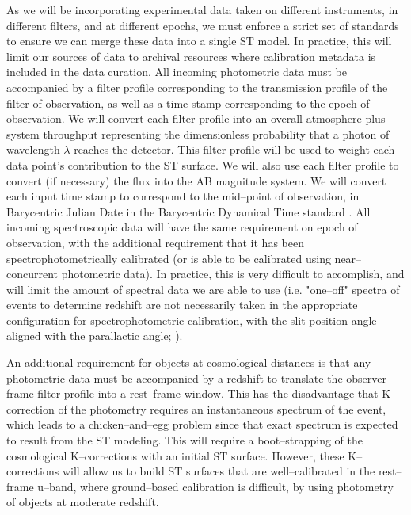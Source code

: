 As we will be incorporating experimental data taken on different instruments, in
different filters, and at different epochs, we must enforce a strict set of
standards to ensure we can merge these data into a single ST model. In practice,
this will limit our sources of data to archival resources where calibration
metadata is included in the data curation. All incoming photometric data must be
accompanied by a filter profile corresponding to the transmission profile of the
filter of observation, as well as a time stamp corresponding to the epoch of
observation.  We will convert each filter profile into an overall atmosphere
plus system throughput representing the dimensionless probability that a photon
of wavelength $\lambda$ reaches the detector.  This filter profile will be used
to weight each data point's contribution to the ST surface.  We will also use
each filter profile to convert (if necessary) the flux into the AB magnitude
system.  We will convert each input time stamp to correspond to the mid--point
of observation, in Barycentric Julian Date in the Barycentric Dynamical Time
standard \citep{2010PASP..122..935E}. All incoming spectroscopic data will have
the same requirement on epoch of observation, with the additional requirement
that it has been spectrophotometrically calibrated (or is able to be calibrated
using near--concurrent photometric data).  In practice, this is very difficult
to accomplish, and will limit the amount of spectral data we are able to use
(i.e. "one--off" spectra of events to determine redshift are not necessarily
taken in the appropriate configuration for spectrophotometric calibration, with
the slit position angle aligned with the parallactic angle;
\citealt{1982PASP...94..715F}).

An additional requirement for objects at cosmological distances is that any
photometric data must be accompanied by a redshift to translate the
observer--frame filter profile into a rest--frame window. This has the
disadvantage that K--correction of the photometry \citep{2002astro.ph.10394H}
requires an instantaneous spectrum of the event, which leads to a
chicken--and--egg problem since that exact spectrum is expected to result from
the ST modeling.  This will require a boot--strapping of the cosmological
K--corrections with an initial ST surface.  However, these K--corrections will
allow us to build ST surfaces that are well--calibrated in the rest--frame
u--band, where ground--based calibration is difficult, by using photometry of
objects at moderate redshift.

